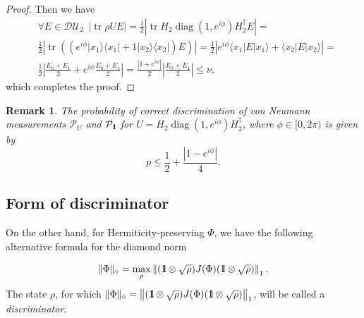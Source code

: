 \documentclass[11pt,a4paper,reqno, oneside]{amsart}
\DeclareMathOperator{\tr}{tr}
\DeclareMathOperator{\diag}{diag}
\newcommand{\ket}[1]{\ensuremath{|#1\rangle}}
\newcommand{\bra}[1]{\ensuremath{\langle#1|}}
\newcommand{\ketbra}[2]{\ensuremath{\ket{#1} \! \bra{#2}}}
\newcommand{\proj}[1]{\ensuremath{\ketbra{#1}{#1}}}
\newcommand{\1}{{\rm 1\hspace{-0.9mm}l}}
\newcommand{\Id}{{\rm 1\hspace{-0.9mm}l}}
\newcommand{\PP}{\mathcal{P}}
\newcommand{\diaguni}{\ensuremath{\mathcal{DU}}}
\newtheorem{remark}{Remark}
\begin{document}
\begin{proof}
	Then we have 
	\begin{equation}
	\begin{split}
	& \forall E \in \diaguni_2 \,\,\, | \tr \rho U E | = \frac{1}{2}  \left| \tr H_2 \diag(1, e^{i\phi}) H_2^\dagger E \right| =  \\ &
	\frac{1}{2} \left| \tr\left((  e^{i \phi} \proj{x_1} + 1 \proj{x_2} ) E \right) \right|  = 
	\frac{1}{2} \left| e^{i \phi}  \bra{x_1} E \ket{x_1} + \bra{x_2} E \ket{x_2} \right| = \\& 
	\frac{1}{2} \left| \frac{E_0 + E_1}{2} + e^{i \phi } \frac{E_0+E_1}{2} \right| = 
	\frac{\left| 1+ e^{i \phi } \right|}{2} \left| \frac{E_0 + E_1}{2} \right| \le \nu, 
		\end{split}
	\end{equation}
	which completes the proof.
\end{proof}

\begin{remark}
	The probability of correct discrimination of von Neumann measurements 
	$\PP_U$ and $\PP_{\Id}$ for $U = H_2 \diag(1, e^{i \phi}) H_2^\dagger$, 
	where $\phi \in [0, 2\pi)$ is given by
	\begin{equation}
	p \le \frac{1}{2} + \frac{|1 - e^{i \phi}  |}{4} . 
	\end{equation}
\end{remark}

\subsection{Form of discriminator}
On the other hand, for Hermiticity-preserving $\Phi$, we have the following 
alternative formula for the diamond norm

\begin{equation}\label{eqn:diamond-sqrt}
\|  \Phi \|_\diamond = \max_\rho \left\|(\1\otimes \sqrt{\rho}) J(\Phi) 
(\1\otimes 
\sqrt{\rho})\right\|_1.
\end{equation}
The state $\rho$, for which $\|  \Phi \|_\diamond=\left\|(\1\otimes 
\sqrt{\rho}) 
J(\Phi) (\1\otimes 
\sqrt{\rho})\right\|_1$, will be called a \textit{discriminator}.
\end{document}

